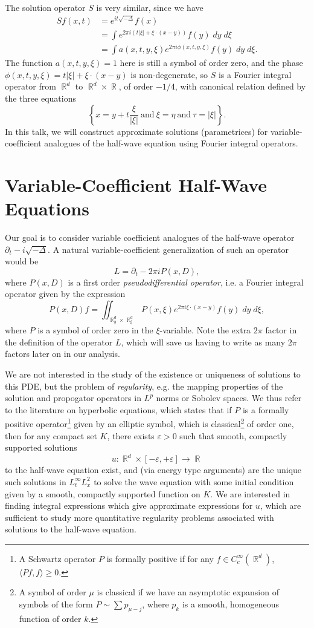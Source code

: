 \documentclass{article}
\theoremstyle{plain}
\theoremstyle{remark}
\theoremstyle{definition}
\DeclareMathOperator{\RR}{\mathbb{R}}
\begin{document}
The solution operator $S$ is very similar, since we have
%
\begin{align*}
	Sf(x,t) &= e^{it \sqrt{-\Delta}} f(x)\\
	&= \int e^{2 \pi i (t |\xi| + \xi \cdot (x - y))} f(y)\; dy\; d\xi\\
	&= \int a(x,t,y,\xi) e^{2 \pi i \phi(x,t,y,\xi)} f(y)\; dy\; d\xi.
\end{align*}
%
The function $a(x,t,y,\xi) = 1$ here is still a symbol of order zero, and the phase $\phi(x,t,y,\xi) = t |\xi| + \xi \cdot (x - y)$ is non-degenerate, so $S$ is a Fourier integral operator from $\RR^d$ to $\RR^d \times \RR$, of order $-1/4$, with canonical relation defined by the three equations
%
\[ \left\{ x = y + t \frac{\xi}{|\xi|}\ \text{and}\ \xi = \eta\ \text{and}\ \tau = |\xi| \right\}. \]
%
In this talk, we will construct approximate solutions (parametrices) for variable-coefficient analogues of the half-wave equation using Fourier integral operators.

\section{Variable-Coefficient Half-Wave Equations}

Our goal is to consider variable coefficient analogues of the half-wave operator $\partial_t - i \sqrt{-\Delta}$. A natural variable-coefficient generalization of such an operator would be
%
\[ L = \partial_t - 2 \pi i P(x,D), \]
%
where $P(x,D)$ is a first order \emph{pseudodifferential operator}, i.e. a Fourier integral operator given by the expression
%
\[ P(x,D) f = \iint_{\RR^d_y \times \RR^d_\xi} P(x,\xi) e^{2 \pi i \xi \cdot (x - y)} f(y)\; dy\; d\xi, \]
%
where $P$ is a symbol of order zero in the $\xi$-variable. Note the extra $2 \pi$ factor in the definition of the operator $L$, which will save us having to write as many $2\pi$ factors later on in our analysis.

We are not interested in the study of the existence or uniqueness of solutions to this PDE, but the problem of \emph{regularity}, e.g. the mapping properties of the solution and propogator operators in $L^p$ norms or Sobolev spaces. We thus refer to the literature on hyperbolic equations, which states that if $P$ is a formally positive operator\footnote{A Schwartz operator $P$ is formally positive if for any $f \in C_c^\infty(\RR^d)$, $\langle Pf, f \rangle \geq 0$.}  given by an elliptic symbol, which is classical\footnote{A symbol of order $\mu$ is classical if we have an asymptotic expansion of symbols of the form $P \sim \sum p_{\mu-j}$, where $p_k$ is a smooth, homogeneous function of order $k$.} of order one, then for any compact set $K$, there exists $\varepsilon > 0$ such that smooth, compactly supported solutions
%
\[ u: \RR^d \times [-\varepsilon,+\varepsilon] \to \RR \]
%
to the half-wave equation exist, and (via energy type arguments) are the unique such solutions in $L^\infty_t L^2_x$ to solve the wave equation with some initial condition given by a smooth, compactly supported function on $K$. We are interested in finding integral expressions which give approximate expressions for $u$, which are sufficient to study more quantitative regularity problems associated with solutions to the half-wave equation.
\end{document}
